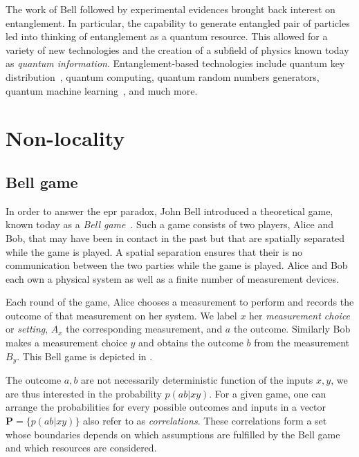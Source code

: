 \medbreak
The work of Bell followed by experimental evidences brought back interest on entanglement.
In particular, the capability to generate entangled pair of particles led into thinking of entanglement as a quantum resource.
This allowed for a variety of new technologies and the creation of a subfield of physics known today as \textit{quantum information}.
Entanglement-based technologies include quantum key distribution~\cite{Ekert1991}, quantum computing, quantum random numbers generators, quantum machine learning~\cite{Biamonte2017}, and much more. 


\chapter{Non-locality}
\label{section:nonlocality}


\section{Bell game}

In order to answer the \acrshort{epr} paradox, John Bell introduced a theoretical game, known today as a \textit{Bell game}~\cite{Bell1964}.
Such a game consists of two players, Alice and Bob, that may have been in contact in the past but that are spatially separated while the game is played.
A spatial separation ensures that their is no communication between the two parties while the game is played.
Alice and Bob each own a physical system as well as a finite number of measurement devices.

Each round of the game, Alice chooses a measurement to perform and records the outcome of that measurement on her system.
We label $x$ her \textit{measurement choice} or \textit{setting}, $A_x$ the corresponding measurement, and $a$ the outcome.
Similarly Bob makes a measurement choice $y$ and obtains the outcome $b$ from the measurement $B_y$.
This Bell game is depicted in .

The outcome $a,b$ are not necessarily deterministic function of the inputs $x,y$, we are thus interested in the  probability $p(ab|xy)$. 
For a given game, one can arrange the probabilities for every possible outcomes and inputs in a vector $\mathbf{P}=\{ p(ab|xy)\}$ also refer to as \textit{correlations}.
These correlations form a set whose boundaries depends on which assumptions are fulfilled by the Bell game and which resources are considered.

